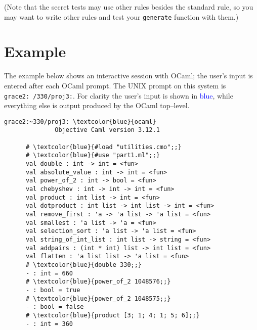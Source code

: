 \documentclass[11pt]{article}
\begin{document}
    (Note that the secret tests may use other rules besides the standard
  rule, so you may want to write other rules and test your \texttt{generate}
  function with them.)

    \enlargethispage{2mm}

  \section{Example}

    The example below shows an interactive session with OCaml; the user's
  input is entered after each OCaml prompt.  The UNIX prompt on this system
  is \texttt{grace2:\string~/330/proj3:}.  For clarity the user's input is
  shown in \textcolor{blue}{blue}, while everything else is output
  produced by the OCaml top--level.

    \vspace{-1mm}

    \begin{center}

      \begin{BVerbatim}[gobble=6,baselinestretch=.95,commandchars=\\\{\}]
      grace2:~330/proj3: \textcolor{blue}{ocaml}
              Objective Caml version 3.12.1

      # \textcolor{blue}{#load "utilities.cmo";;}
      # \textcolor{blue}{#use "part1.ml";;}
      val double : int -> int = <fun>
      val absolute_value : int -> int = <fun>
      val power_of_2 : int -> bool = <fun>
      val chebyshev : int -> int -> int = <fun>
      val product : int list -> int = <fun>
      val dotproduct : int list -> int list -> int = <fun>
      val remove_first : 'a -> 'a list -> 'a list = <fun>
      val smallest : 'a list -> 'a = <fun>
      val selection_sort : 'a list -> 'a list = <fun>
      val string_of_int_list : int list -> string = <fun>
      val addpairs : (int * int) list -> int list = <fun>
      val flatten : 'a list list -> 'a list = <fun>
      # \textcolor{blue}{double 330;;}
      - : int = 660
      # \textcolor{blue}{power_of_2 1048576;;}
      - : bool = true
      # \textcolor{blue}{power_of_2 1048575;;}
      - : bool = false
      # \textcolor{blue}{product [3; 1; 4; 1; 5; 6];;}
      - : int = 360
      \end{BVerbatim}

    \end{center}

    \vspace{-1mm}
\end{document}

